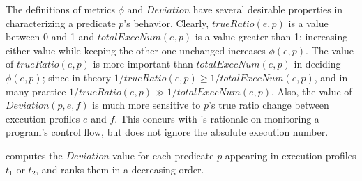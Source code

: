 The definitions of metrics $\phi$ and $Deviation$ have several desirable properties
in characterizing a predicate $p$'s behavior. Clearly, $trueRatio(e,p)$
is a value between 0 and 1 and $totalExecNum(e, p)$ is a value greater than 1; increasing
either value while keeping the other one unchanged increases $\phi(e, p)$.
The value of $trueRatio(e, p)$ is more important than $totalExecNum(e, p)$
in deciding $\phi(e, p)$; since in theory $1/trueRatio(e, p) \geq 1/totalExecNum(e, p)$, and
in many practice $1/trueRatio(e, p) \gg 1/totalExecNum(e, p)$.
Also, the value of $Deviation(p, e, f)$ is much more sensitive to $p$'s
true ratio change between execution profiles $e$ and $f$. This concurs with
\ourtool's rationale on monitoring a program's control flow, but does not
ignore the absolute execution number.




\ourtool computes the $Deviation$ value for each predicate $p$
appearing in execution profiles $t_1$ or $t_2$, and
ranks them in a decreasing order. 







